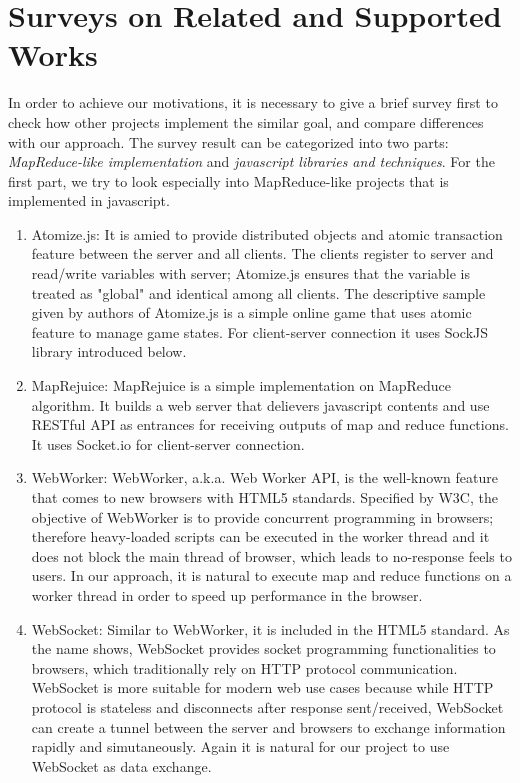 \section{Surveys on Related and Supported Works}
\label{ch4}

In order to achieve our motivations, it is necessary to give a brief survey first to check how other projects implement the similar goal, and compare differences with our approach.
The survey result can be categorized into two parts: \emph{MapReduce-like implementation} and \emph{javascript libraries and techniques}. For the first part, we try to look especially into MapReduce-like projects that is implemented in javascript.

\begin{enumerate}
%

\item Atomize.js\cite{atomizejs}:
  It is amied to provide distributed objects and atomic transaction feature between the server and all clients. The clients register to server and read/write variables with server; Atomize.js ensures that the variable is treated as "global" and identical among all clients. The descriptive sample given by authors of Atomize.js is a simple online game that uses atomic feature to manage game states. For client-server connection it uses SockJS library introduced below.

\item MapRejuice\cite{maprejuice}:
  MapRejuice is a simple implementation on MapReduce algorithm. It builds a web server that delievers javascript contents and use RESTful API as entrances for receiving outputs of map and reduce functions.
  It uses Socket.io for client-server connection.

\item WebWorker\cite{webworker}:
  WebWorker, a.k.a. Web Worker API, is the well-known feature that comes to new browsers with HTML5 standards. Specified by W3C, the objective of WebWorker is to provide concurrent programming in browsers; therefore heavy-loaded scripts can be executed in the worker thread and it does not block the main thread of browser, which leads to no-response feels to users.
  In our approach, it is natural to execute map and reduce functions on a worker thread in order to speed up performance in the browser.

\item WebSocket\cite{websocket}:
  Similar to WebWorker, it is included in the HTML5 standard. As the name shows, WebSocket provides socket programming functionalities to browsers, which traditionally rely on HTTP protocol communication.
  WebSocket is more suitable for modern web use cases because while HTTP protocol is stateless and disconnects after response sent/received, WebSocket can create a tunnel between the server and browsers to exchange information rapidly and simutaneously.
  Again it is natural for our project to use WebSocket as data exchange.


\end{enumerate}
